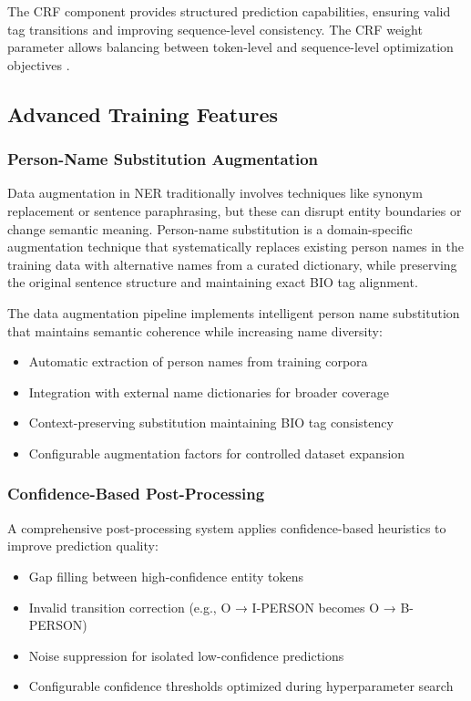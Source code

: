 \documentclass[a4paper]{usiinfbachelorproject}
\begin{document}
The CRF component provides structured prediction capabilities, ensuring valid tag transitions and improving sequence-level consistency. The CRF weight parameter allows balancing between token-level and sequence-level optimization objectives \cite{PATIL20201181}.

\subsection{Advanced Training Features}

\subsubsection{Person-Name Substitution Augmentation}

Data augmentation in NER traditionally involves techniques like synonym replacement or sentence paraphrasing, but these can disrupt entity boundaries or change semantic meaning. Person-name substitution is a domain-specific augmentation technique that systematically replaces existing person names in the training data with alternative names from a curated dictionary, while preserving the original sentence structure and maintaining exact BIO tag alignment.

The data augmentation pipeline implements intelligent person name substitution that maintains semantic coherence while increasing name diversity:

\begin{itemize}
    \item Automatic extraction of person names from training corpora
    \item Integration with external name dictionaries for broader coverage
    \item Context-preserving substitution maintaining BIO tag consistency
    \item Configurable augmentation factors for controlled dataset expansion
\end{itemize}

\subsubsection{Confidence-Based Post-Processing}

A comprehensive post-processing system applies confidence-based heuristics to improve prediction quality:

\begin{itemize}
    \item Gap filling between high-confidence entity tokens
    \item Invalid transition correction (e.g., O → I-PERSON becomes O → B-PERSON)
    \item Noise suppression for isolated low-confidence predictions
    \item Configurable confidence thresholds optimized during hyperparameter search
\end{itemize}
\end{document}
